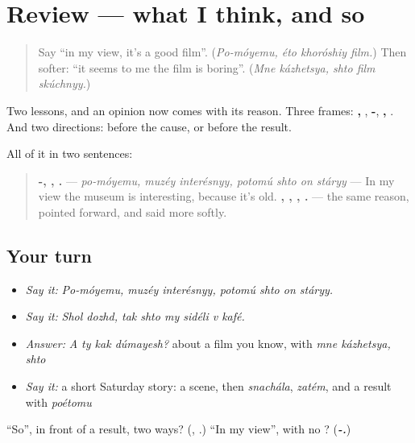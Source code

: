 \section[(review)]{Review — what I think, and so}

\label{lesson:RU-C263-review}



\begin{quote}
Say \textquotedblleft{}in my view, it's a good film\textquotedblright{}. (\emph{Po-móyemu, éto khoróshiy film.}) Then softer: \textquotedblleft{}it seems to me the film is boring\textquotedblright{}. (\emph{Mne kázhetsya, shto film skúchnyy.})
\end{quote}

\begin{grammarlens}[title={What you've built}]
Two lessons, and an opinion now comes with its reason. Three frames: \textbf{ , }, \textbf{-}, \textbf{ , }. And two directions: \textbf{ } before the cause, \textbf{} or \textbf{ } before the result.

All of it in two sentences:

\begin{quote}
\textbf{-,  ,    .} — \emph{po-móyemu, muzéy interésnyy, potomú shto on stáryy} — In my view the museum is interesting, because it's old. \textbf{ , ,  ,  .} — the same reason, pointed forward, and said more softly.
\end{quote}
\end{grammarlens}

\subsection*{Your turn}
\begin{itemize}
\raggedright
  \item \emph{Say it:} \emph{Po-móyemu, muzéy interésnyy, potomú shto on stáryy.}
  \item \emph{Say it:} \emph{Shol dozhd, tak shto my sidéli v kafé.}
  \item \emph{Answer:} \emph{A ty kak dúmayesh?} about a film you know, with \emph{mne kázhetsya, shto}
  \item \emph{Say it:} a short Saturday story: a scene, then \emph{snachála}, \emph{zatém}, and a result with \emph{poétomu}
\end{itemize}

\begin{tcolorbox}[breakable,colback=teal!4,colframe=teal!35!black,title={Before you move on}]
\textquotedblleft{}So\textquotedblright{}, in front of a result, two ways? (\emph{\textbf{}}, \emph{\textbf{ }}.) \textquotedblleft{}In my view\textquotedblright{}, with no \emph{}? (\emph{\textbf{-.}})
\end{tcolorbox}
